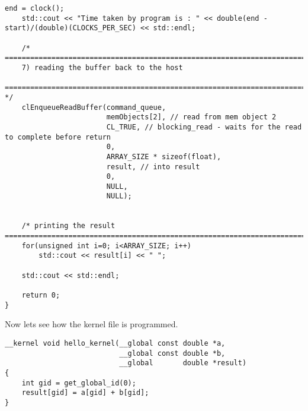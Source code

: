\begin{mdframed}[roundcorner=10pt, backgroundcolor=backgroundgray, outerlinewidth=2]
\begin{lstlisting}[frame=none]
    end = clock(); 
	std::cout << "Time taken by program is : " << double(end - start)/(double)(CLOCKS_PER_SEC) << std::endl;

	/* =======================================================================================================
	7) reading the buffer back to the host
	======================================================================================================= */
    clEnqueueReadBuffer(command_queue, 
						memObjects[2], // read from mem object 2
						CL_TRUE, // blocking_read - waits for the read to complete before return
						0, 
						ARRAY_SIZE * sizeof(float), 
						result, // into result
						0, 
						NULL, 
						NULL);


	/* printing the result ================================================================================*/
	for(unsigned int i=0; i<ARRAY_SIZE; i++) 
		std::cout << result[i] << " ";

	std::cout << std::endl;

	return 0;
}

\end{lstlisting}
\end{mdframed} 
\pagebreak
Now lets see how the kernel file is programmed.
\begin{mdframed}[roundcorner=10pt, backgroundcolor=backgroundgray, outerlinewidth=2]
\begin{lstlisting}[frame=none]
__kernel void hello_kernel(__global const double *a, 
						   __global const double *b, 
						   __global       double *result)
{
    int gid = get_global_id(0);
    result[gid] = a[gid] + b[gid];
}
\end{lstlisting}
\end{mdframed} 
